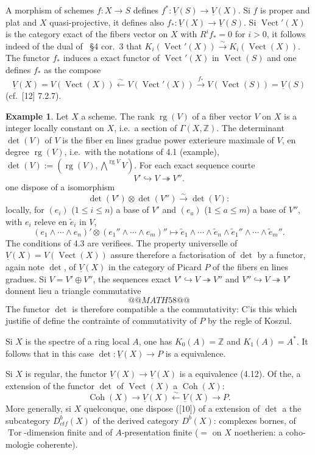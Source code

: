 \documentclass[12pt,a4paper]{article}
\theoremstyle{plain}
\theoremstyle{definition}
\newtheorem{example}[theorem]{Example}
\DeclareMathOperator{\rank}{rg}
\DeclareMathOperator{\Vect}{Vect}
\DeclareMathOperator{\Coh}{Coh}
\DeclareMathOperator{\Tor}{Tor}
\newcommand{\ZZ}{\mathbb{Z}}
\begin{document}
A morphism of schemes $f: X \to S$ defines $f^*: \underline{V}(S) \to \underline{V}(X)$. Si $f$ is
proper and plat and $X$ quasi-projective, it defines also $f_*: \underline{V}(X) \to \underline{V}(S)$. Si
$\Vect'(X)$ is the category exact of the fibers vector on $X$ with $R^i f_* = 0$
for $i > 0$, it follows indeed of the dual of~\cite{12} \S4 cor.~3 that $K_i(\Vect'(X)) \xrightarrow{\sim}
K_i(\Vect(X))$. The functor $f_*$ induces a exact functor of $\Vect'(X)$ in $\Vect(S)$
and one defines $f_*$ as the compose
\[
\underline{V}(X) = V(\Vect(X)) \xleftarrow{\sim} V(\Vect'(X)) \xrightarrow{f_*} V(\Vect(S)) = \underline{V}(S)
\]
(cf.~[12] 7.2.7).

\begin{example}
Let $X$ a scheme. The rank $\rank(V)$ of a fiber vector $V$ on
$X$ is a integer locally constant on $X$, i.e.\ a section of $\Gamma(X, \ZZ)$. The
determinant $\det(V)$ of $V$ is the fiber en lines gradue power exterieure
maximale of $V$, en degree $\rank(V)$, i.e.\ with the notations of 4.1 (example), $\det(V)
:= (\rank(V), \bigwedge^{\rank V} V)$. For each exact sequence courte
\[
V' \hookrightarrow V \twoheadrightarrow V'' .
\]
one dispose of a isomorphism
\[
\det(V') \otimes \det(V'') \xrightarrow{\sim} \det(V):
\]
locally, for $(e_i)$ ($1 \leq i \leq n$) a base of $V'$ and $(e_a)$ ($1 \leq a \leq m$) a
base of $V''$, with $e_i$ releve en $\tilde{e}_i$ in $V$,
\[
(e_1 \wedge \cdots \wedge e_n)' \otimes (e_1'' \wedge \cdots \wedge e_m)'' \mapsto \tilde{e}_1 \wedge \cdots \wedge \tilde{e}_n \wedge \tilde{e}_1'' \wedge \cdots \wedge \tilde{e}_m'' .
\]
The conditions of 4.3 are verifiees. The property universelle of $\underline{V}(X) = V(\Vect(X))$
assure therefore a factorisation of $\det$ by a functor, again note $\det$, of
$\underline{V}(X)$ in the category of Picard $P$ of the fibers en lines gradues. Si $V =
V' \oplus V''$, the sequences exact $V' \hookrightarrow V \twoheadrightarrow V''$ and $V'' \hookrightarrow V \twoheadrightarrow V'$ donnent lieu a triangle commutative
\[
@@MATH58@@
\]
The functor $\det$ is therefore compatible a the commutativity: C'is this which justifie
of define the contrainte of commutativity of $P$ by the regle of Koszul.

Si $X$ is the spectre of a ring local $A$, one has $K_0(A) = \ZZ$ and $K_1(A) =
A^*$. It follows that in this case $\det: \underline{V}(X) \to P$ is a equivalence.

Si $X$ is regular, the functor $\underline{V}(X) \to \underline{V}(X)$ is a equivalence (4.12).
Of the, a extension of the functor $\det$ of $\Vect(X)$ a $\Coh(X)$:
\[
\Coh(X) \to \underline{V}(X) \xleftarrow{\sim} \underline{V}(X) \to P .
\]
More generally, si $X$ quelconque, one dispose ([10]) of a extension of $\det$
a the subcategory $D^b_{ctf}(X)$ of the derived category $D^b(X)$: complexes bornes,
of $\Tor$-dimension finite and of $A$-presentation finite ($=$ on $X$ noetherien: a coho-
mologie coherente).
\end{example}
\end{document}
